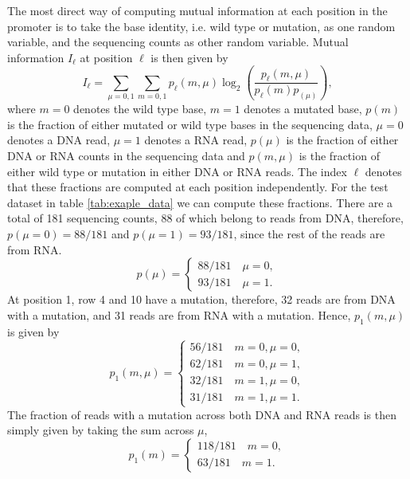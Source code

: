 \iffalse
The most direct way of computing mutual information at each position in the promoter is to take the base identity, i.e. wild type or mutation, as one random variable, and the sequencing counts as other random variable. Mutual information $I_\ell$ at position $\ell$ is then given by
\begin{equation}
    I_\ell = \sum_{\mu=0, 1}\sum_{m=0, 1} p_{\ell}(m, \mu)\log_2\left(\frac{p_{\ell}(m, \mu)}{p_{\ell}(m)p_(\mu)}\right),
\end{equation}
where $m=0$ denotes the wild type base, $m=1$ denotes a mutated base, $p(m)$ is the fraction of either mutated or wild type bases in the sequencing data, $\mu=0$ denotes a DNA read, $\mu=1$ denotes a RNA read, $p(\mu)$ is the fraction of either DNA or RNA counts in the sequencing data and $p(m, \mu)$ is the fraction of either wild type or mutation in either DNA or RNA reads. The index $\ell$ denotes that these fractions are computed at each position independently. For the test dataset in table \ref{tab:exaple_data} we can compute these fractions. There are a total of 181 sequencing counts, 88 of which belong to reads from DNA, therefore, $p(\mu=0) = 88/181$ and $p(\mu=1)=93/181$, since the rest of the reads are from RNA.
\begin{equation}
    p(\mu) = \begin{cases}
        88/181\quad\mu=0,\\
        93/181\quad\mu=1.
    \end{cases}
\end{equation}
At position 1, row 4 and 10 have a mutation, therefore, 32 reads are from DNA with a mutation, and 31 reads are from RNA with a mutation. Hence, $p_{1}(m, \mu)$ is given by 
\begin{equation}
    p_1(m, \mu) = \begin{cases}
        56/181\quad m=0,\mu=0,\\
        62/181\quad m=0,\mu=1,\\
        32/181\quad m=1,\mu=0,\\
        31/181\quad m=1,\mu=1.
    \end{cases}
\end{equation}
The fraction of reads with a mutation across both DNA and RNA reads is then simply given by taking the sum across $\mu$,
\begin{equation}
    p_1(m) = \begin{cases}
        118/181\quad m=0,\\
        63/181\quad m=1.
    \end{cases}
\end{equation}
